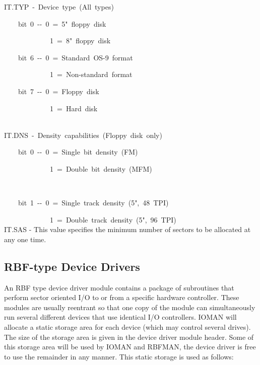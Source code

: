 \documentclass[
]{article}
\begin{document}
IT.TYP~-~Device~type~(All~types)\\
\strut ~~~~bit~0~-\/-~0~=~5"~floppy~disk\\
\strut ~~~~~~~~~~~~~1~=~8"~floppy~disk\\
\strut ~~~~bit~6~-\/-~0~=~Standard~OS-9~format\\
\strut ~~~~~~~~~~~~~1~=~Non-standard~format\\
\strut ~~~~bit~7~-\/-~0~=~Floppy~disk\\
\strut ~~~~~~~~~~~~~1~=~Hard~disk\\
\strut ~\\
IT.DNS~-~Density~capabilities~(Floppy~disk~only)\\
\strut ~~~~bit~0~-\/-~0~=~Single~bit~density~(FM)\\
\strut ~~~~~~~~~~~~~1~=~Double~bit~density~(MFM)\\
\strut ~\\
\strut ~~~~bit~1~-\/-~0~=~Single~track~density~(5",~48~TPI)\\
\strut ~~~~~~~~~~~~~1~=~Double~track~density~(5",~96~TPI)\\

IT.SAS - This value specifies the minimum number of sectors to be
allocated at any one time.

\subsection{RBF-type Device Drivers}

An RBF type device driver module contains a package of subroutines that
perform sector oriented I/O to or from a specific hardware controller.
These modules are usually reentrant so that one copy of the module can
simultaneously run several different devices that use identical I/O
controllers. IOMAN will allocate a static storage area for each device
(which may control several drives). The size of the storage area is
given in the device driver module header. Some of this storage area will
be used by IOMAN and RBFMAN, the device driver is free to use the
remainder in any manner. This static storage is used as follows:
\end{document}
